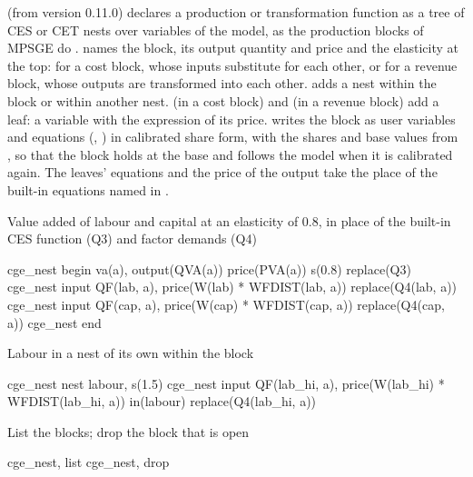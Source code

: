 

 (from version 0.11.0) declares a production or transformation
function as a tree of CES or CET nests over variables of the model, as the
production blocks of MPSGE do \citep{rutherford1999}. 
names the block, its output quantity and price and the elasticity at the top:
 for a cost block, whose inputs substitute for each other, or
 for a revenue block, whose outputs are transformed into each
other.  adds a nest within the block or within another
nest.  (in a cost block) and  (in a
revenue block) add a leaf: a variable with the expression of its price.
 writes the block as user variables and equations
(, ) in calibrated share form, with
the shares and base values from , so that the block holds at the
base and follows the model when it is calibrated again. The leaves' equations
and the price of the output take the place of the built-in equations named in
.


Value added of labour and capital at an elasticity of 0.8, in place of the
built-in CES function (Q3) and factor demands (Q4)
\begin{stcode}
cge_nest begin va(a), output(QVA(a)) price(PVA(a)) s(0.8) replace(Q3)
cge_nest input QF(lab, a), price(W(lab) * WFDIST(lab, a)) replace(Q4(lab, a))
cge_nest input QF(cap, a), price(W(cap) * WFDIST(cap, a)) replace(Q4(cap, a))
cge_nest end
\end{stcode}
Labour in a nest of its own within the block
\begin{stcode}
cge_nest nest labour, s(1.5)
cge_nest input QF(lab_hi, a), price(W(lab_hi) * WFDIST(lab_hi, a)) in(labour) replace(Q4(lab_hi, a))
\end{stcode}
List the blocks; drop the block that is open
\begin{stcode}
cge_nest, list
cge_nest, drop
\end{stcode}


